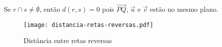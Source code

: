 Se $r \cap s \ne \emptyset$, ent\~ao $d(r,s) = 0$ pois $\vec{PQ}$, $\vec{u}$ e $\vec{v}$ est\~ao no mesmo plano.
\begin{figure}[h]
    \centering
    \caption{Dist\^ancia entre retas reversas}
    \texttt{[image: distancia-retas-reversas.pdf]}
\end{figure}


